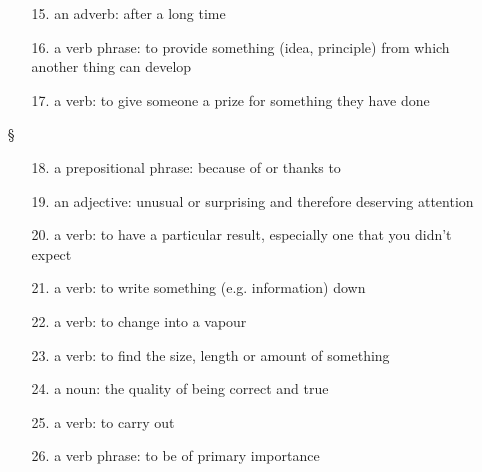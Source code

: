 \begin{enumerate}
            \begin{enumerate}
                  \item[15.] an adverb: after a long time
                  \item[16.] a verb phrase: to provide something (idea, principle) from
                        which another thing can develop
                  \item[17.] a verb: to give someone a prize for something they have done
            \end{enumerate}
      \item[§] 
            \begin{enumerate}
                  \item[18.] a prepositional phrase: because of or thanks to
                  \item[19.] an adjective: unusual or surprising and therefore deserving
                        attention
                  \item[20.] a verb: to have a particular result, especially one that you
                        didn’t expect
                  \item[21.] a verb: to write something (e.g. information) down
                  \item[22.] a verb: to change into a vapour
                  \item[23.] a verb: to find the size, length or amount of something
                  \item[24.] a noun: the quality of being correct and true
                  \item[25.] a verb: to carry out
                  \item[26.] a verb phrase: to be of primary importance
            \end{enumerate}
\end{enumerate}

